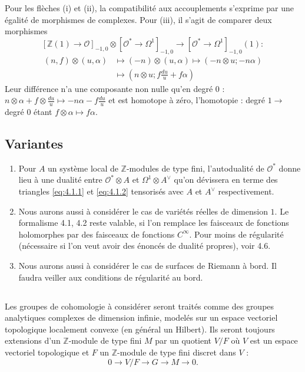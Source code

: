 \documentclass[12pt,a4paper]{article}
\theoremstyle{plain}
\theoremstyle{definition}
\theoremstyle{remark}
\newcommand{\cO}{\mathcal{O}}
\newcommand{\Z}{\mathbb{Z}}
\providecommand{\cO}{\mathcal{O}}
\begin{document}
Pour les flèches (i) et (ii), la compatibilité aux accouplements s'exprime par une égalité
de morphismes de complexes. Pour (iii), il s'agit de comparer deux morphismes
\[
[\Z(1) \to \cO]_{-1,0} \otimes [\cO^* \to \Omega^1]_{-1,0} \to [\cO^* \to \Omega^1]_{-1,0}(1) :
\]
\begin{align*}
(n, f) \otimes (u, \alpha) &\longmapsto (-n) \otimes (u, \alpha) \longmapsto (-n \otimes u; -n\alpha) \\
&\longmapsto (n \otimes u; f \tfrac{du}{u} + f\alpha)
\end{align*}
Leur différence n'a une composante non nulle qu'en degré $0$ : $n \otimes \alpha + f \otimes \tfrac{du}{u} \mapsto -n\alpha - f\tfrac{du}{u}$
et est homotope à zéro, l'homotopie : degré $1 \to$ degré $0$ étant $f \otimes \alpha \mapsto f\alpha$.

\subsection{Variantes}

\begin{enumerate}[label=(\roman*)]
\item Pour $A$ un système local de $\Z$-modules de type fini, l'autodualité
de $\cO^*$ donne lieu à une dualité entre $\cO^* \otimes A$ et $\Omega^1 \otimes A^\vee$ qu'on dévissera en terme des
triangles \eqref{eq:4.1.1} et \eqref{eq:4.1.2} tensorisés avec $A$ et $A^\vee$ respectivement.
\item Nous aurons aussi à considérer le cas de variétés réelles de dimension $1$. Le
formalisme 4.1, 4.2 reste valable, si l'on remplace les faisceaux de fonctions holomorphes
par des faisceaux de fonctions $C^\infty$. Pour moins de régularité (nécessaire si l'on veut
avoir des énoncés de dualité propres), voir 4.6.
\item Nous aurons aussi à considérer le cas de surfaces de Riemann à bord. Il faudra
veiller aux conditions de régularité au bord.
\end{enumerate}

\subsection{}

Les groupes de cohomologie à considérer seront traités comme des groupes
analytiques complexes de dimension infinie, modelés sur un espace vectoriel topologique
localement convexe (en général un Hilbert). Ils seront toujours extensions d'un $\Z$-module
de type fini $M$ par un quotient $V/F$ où $V$ est un espace vectoriel topologique et $F$ un
$\Z$-module de type fini discret dans $V$ :
\[
0 \to V/F \to G \to M \to 0.
\]
\end{document}
